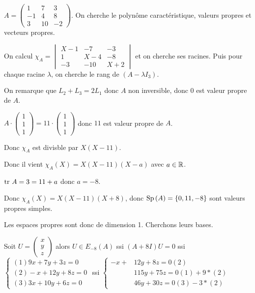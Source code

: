 \begin{exemple}
    $A = \begin{pmatrix}
        1 & 7 & 3 \\
        -1 & 4 & 8 \\
        3 & 10 & -2
    \end{pmatrix}$. On cherche le polynôme caractéristique, valeurs propres et vecteurs propres. 


    \svspace On calcul $\chi_A = \begin{vmatrix}
        X - 1 & -7 & -3 \\
        1 & X - 4 & -8 \\
        -3 & -10 & X + 2
    \end{vmatrix}$ et on cherche ses racines. Puis pour chaque racine $\lambda$, on cherche le rang de 
    $(A - \lambda I_3)$.


    \svspace On remarque que $L_2 + L_3 = 2 L_1$ donc $A$ non inversible, donc $0$ est valeur propre de $A$. 

    $A \cdot \begin{pmatrix}
        1 \\
        1 \\
        1
    \end{pmatrix} = 11 \cdot \begin{pmatrix}
        1 \\
        1 \\
        1
    \end{pmatrix}$ donc $11$ est valeur propre de $A$.

    Donc $\chi_A$ est divisble par $X(X - 11)$.

    Donc il vient $\chi_A(X) = X(X - 11)(X - a)$ avec $a \in \mathbb{R}$.

    $\operatorname{tr} \, A = 3 = 11 + a$ donc $a = -8$.

    Donc $\chi_A(X) = X(X - 11)(X + 8)$, donc $\operatorname{Sp} \,(A) = \{0, 11, -8\}$ sont valeurs propres simples.

    Les espaces propres sont donc de dimension 1. Cherchons leurs bases. 

    Soit $U = \begin{pmatrix}
        x \\
        y \\
        z   
    \end{pmatrix}$ alors $U \in E_{-8}(A)$ ssi $(A + 8I) U = 0$ ssi $\begin{cases}
        (1) 9x + 7y + 3z = 0 \\
        (2) -x + 12y + 8z = 0 \\
        (3) 3x + 10y + 6z = 0
    \end{cases}$ ssi $\begin{cases}
        -x +  & 12y + 8z = 0 (2)\\
        & 115y + 75 z = 0 (1) + 9*(2) \\
        & 46 y + 30 z = 0 (3) - 3*(2)
    \end{cases}$ 
    

\end{exemple}
